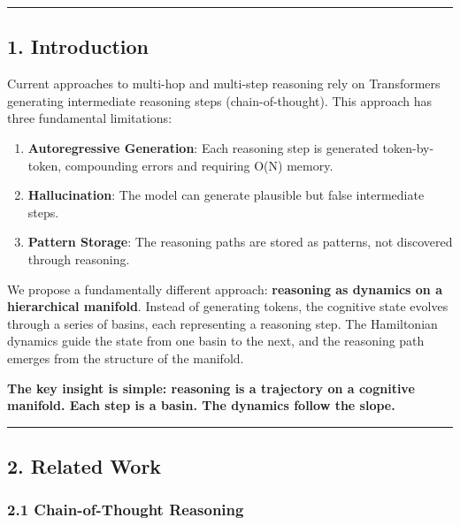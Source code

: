 \documentclass[
  11pt,
  a4paper,
]{article}
\providecommand{\tightlist}{%
  \setlength{\itemsep}{0pt}\setlength{\parskip}{0pt}}
\begin{document}
\begin{center}\rule{0.5\linewidth}{0.5pt}\end{center}

\subsection{1. Introduction}\label{introduction}

Current approaches to multi-hop and multi-step reasoning rely on
Transformers generating intermediate reasoning steps (chain-of-thought).
This approach has three fundamental limitations:

\begin{enumerate}
\def\labelenumi{\arabic{enumi}.}
\tightlist
\item
  \textbf{Autoregressive Generation}: Each reasoning step is generated
  token-by-token, compounding errors and requiring O(N) memory.
\item
  \textbf{Hallucination}: The model can generate plausible but false
  intermediate steps.
\item
  \textbf{Pattern Storage}: The reasoning paths are stored as patterns,
  not discovered through reasoning.
\end{enumerate}

We propose a fundamentally different approach: \textbf{reasoning as
dynamics on a hierarchical manifold}. Instead of generating tokens, the
cognitive state evolves through a series of basins, each representing a
reasoning step. The Hamiltonian dynamics guide the state from one basin
to the next, and the reasoning path emerges from the structure of the
manifold.

\textbf{The key insight is simple: reasoning is a trajectory on a
cognitive manifold. Each step is a basin. The dynamics follow the
slope.}

\begin{center}\rule{0.5\linewidth}{0.5pt}\end{center}

\subsection{2. Related Work}\label{related-work}

\subsubsection{2.1 Chain-of-Thought
Reasoning}\label{chain-of-thought-reasoning}
\end{document}
